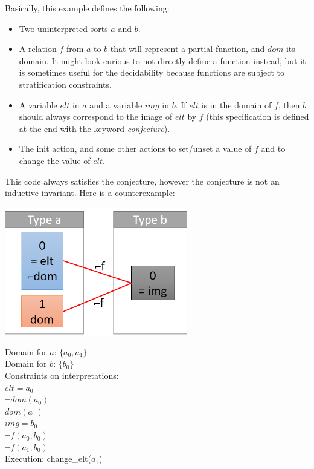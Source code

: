 \documentclass[11pt,a4paper,oldfontcommands,openany]{memoir}
\begin{document}
    Basically, this example defines the following:
    \begin{itemize}
        \item Two uninterpreted sorts \(a\) and \(b\).
        \item A relation \(f\) from \(a\) to \(b\) that will represent a partial function, and \(dom\) its domain. It might look curious to not directly define a function instead,
        but it is sometimes useful for the decidability because functions are subject to stratification constraints.
        \item A variable \(elt\) in \(a\) and a variable \(img\) in \(b\). If \(elt\) is in the domain of \(f\), then \(b\) should always
        correspond to the image of \(elt\) by \(f\) (this specification is defined at the end with the keyword \textit{conjecture}).
        \item The init action, and some other actions to set/unset a value of \(f\) and to change the value of \(elt\).
    \end{itemize}

    This code always satisfies the conjecture, however the conjecture is not an inductive invariant. Here is a counterexample:\\

    \begin{minipage}{0.45\textwidth}
        \includegraphics[width=8cm]{NonMonotonicExCounterexample}
    \end{minipage} \hfill
    \begin{minipage}{0.45\textwidth}
        Domain for \(a\): \(\{a_0,a_1\}\)\\
        Domain for \(b\): \(\{b_0\}\)\\
        Constraints on interpretations:\\
        \(elt = a_0\)\\
        \(\neg dom(a_0)\)\\
        \(dom(a_1)\)\\
        \(img = b_0\)\\
        \(\neg f(a_0,b_0)\)\\
        \(\neg f(a_1,b_0)\)\\
        Execution: change_elt(\(a_1\))
    \end{minipage}\\
\end{document}
